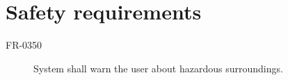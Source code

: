 \section{Safety requirements}

\begin{description}
\item[FR-0350] System shall warn the user about hazardous surroundings.
\end{description}